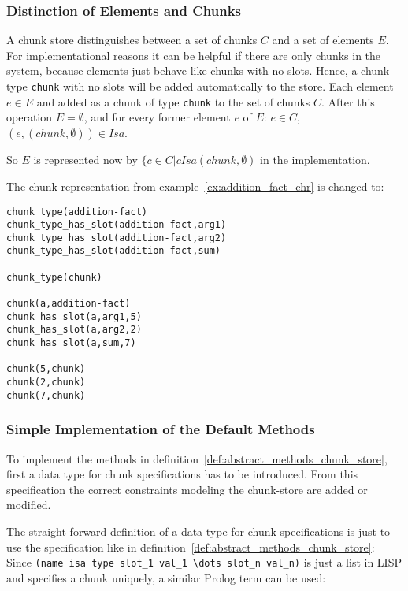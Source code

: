 \subsubsection{Distinction of Elements and Chunks}
\label{distinction_elements_chunks}

A chunk store distinguishes between a set of chunks $C$ and a set of elements $E$. For implementational reasons it can be helpful if there are only chunks in the system, because elements just behave like chunks with no slots. Hence, a chunk-type \verb|chunk| with no slots will be added automatically to the store. Each element $e \in E$ and added as a chunk of type \verb|chunk| to the set of chunks $C$. After this operation $E = \emptyset$, and for every former element $e$ of $E$: $e \in C$, $(e,(chunk,\emptyset)) \in Isa$.

So $E$ is represented now by $\{ c \in C | c Isa (chunk,\emptyset)$ in the implementation.

\begin{example}
The chunk representation from example~\ref{ex:addition_fact_chr} is changed to:

\begin{lstlisting}
chunk_type(addition-fact)
chunk_type_has_slot(addition-fact,arg1)
chunk_type_has_slot(addition-fact,arg2)
chunk_type_has_slot(addition-fact,sum)

chunk_type(chunk)

chunk(a,addition-fact)
chunk_has_slot(a,arg1,5)
chunk_has_slot(a,arg2,2)
chunk_has_slot(a,sum,7)

chunk(5,chunk)
chunk(2,chunk)
chunk(7,chunk)
\end{lstlisting}

\end{example}


\subsubsection{Simple Implementation of the Default Methods}
\label{chunk_specification}

To implement the methods in definition~\ref{def:abstract_methods_chunk_store}, first a data type for chunk specifications has to be introduced. From this specification the correct constraints modeling the chunk-store are added or modified.

The straight-forward definition of a data type for chunk specifications is just to use the specification like in definition~\ref{def:abstract_methods_chunk_store}: Since \verb|(name isa type slot_1 val_1 \dots slot_n val_n)| is just a list in LISP and specifies a chunk uniquely, a similar Prolog term can be used:


